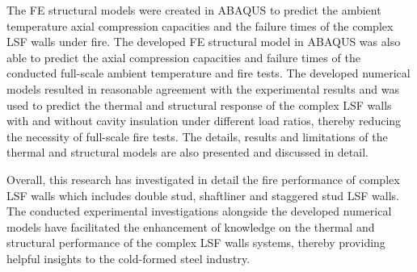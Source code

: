 {The FE structural models were created in ABAQUS to predict the ambient temperature axial compression capacities and the failure times of the complex LSF walls under fire. The developed FE structural model in ABAQUS was also able to predict the axial compression capacities and failure times of the conducted full-scale ambient temperature and fire tests. The developed numerical models resulted in reasonable agreement with the experimental results and was used to predict the thermal and structural response of the complex LSF walls with and without cavity insulation under different load ratios, thereby reducing the necessity of full-scale fire tests. The details, results and limitations of the thermal and structural models are also presented and discussed in detail.

Overall, this research has investigated in detail the fire performance of complex LSF walls which includes double stud, shaftliner and staggered stud LSF walls. The conducted experimental investigations alongside the developed numerical models have facilitated the enhancement of knowledge on the thermal and structural performance of the complex LSF walls systems, thereby providing helpful insights to the cold-formed steel industry.

}
